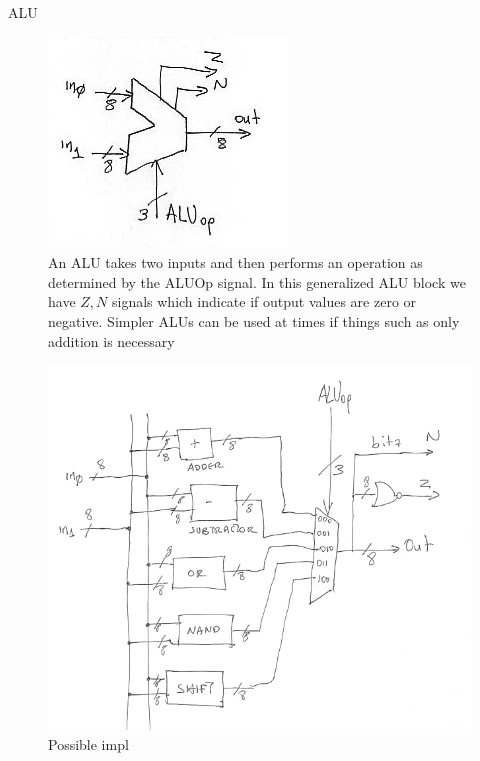 \documentclass[../notes.tex]{subfiles}
\begin{document}
\begin{definition}
	ALU
	\begin{figure}[H]
		\centering
		\includegraphics[width=0.8\linewidth]{img/image_2022-12-10-15-42-21.png}
		\caption{An ALU takes two inputs and then performs an operation as determined by the ALUOp signal. In this generalized ALU block we have $ Z, N $ signals which indicate if output values are zero or negative. Simpler ALUs can be used at times if things such as only addition is necessary}
	\end{figure}

	\begin{figure}[H]
		\centering
		\includegraphics[width=0.8\linewidth]{img/image_2022-12-10-15-43-11.png}
		\caption{Possible impl}
	\end{figure}



\end{definition}
\end{document}
